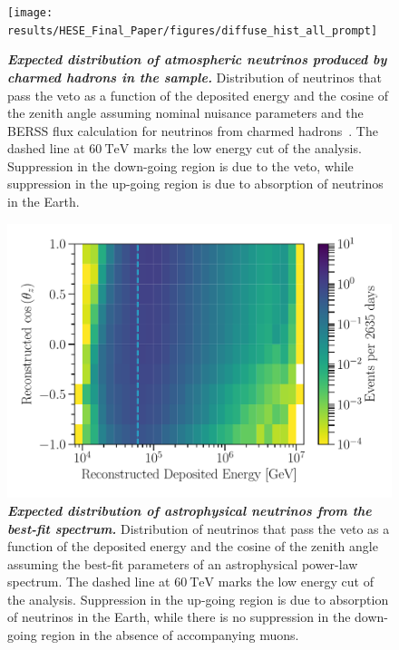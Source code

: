 \begin{figure}
	\centering
	\texttt{[image: results/HESE\_Final\_Paper/figures/diffuse\_hist\_all\_prompt]}
	\internallinenumbers
	\caption{\textbf{\textit{Expected distribution of atmospheric neutrinos produced by charmed hadrons in the sample.}} Distribution of neutrinos that pass the veto as a function of the deposited energy and the cosine of the zenith angle assuming nominal nuisance parameters and the BERSS flux calculation for neutrinos from  charmed hadrons~\cite{Bhattacharya:2015jpa}.
		The dashed line at $\SI{60}\TeV$ marks the low energy cut of the analysis.
		Suppression in the down-going region is due to the veto, while suppression in the up-going region is due to absorption of neutrinos in the Earth.}\label{fig:prompt_distribution}
\end{figure}

\begin{figure}
	\centering
	\includegraphics[width=0.8\linewidth]{figures/diffuse_hist_all_astro_fit}
	\internallinenumbers
	\caption{\textbf{\textit{Expected distribution of astrophysical neutrinos from the best-fit spectrum.}} Distribution of neutrinos that pass the veto as a function of the deposited energy and the cosine of the zenith angle assuming the best-fit parameters of an astrophysical power-law spectrum.
	The dashed line at $\SI{60}\TeV$ marks the low energy cut of the analysis.
	Suppression in the up-going region is due to absorption of neutrinos in the Earth, while there is no suppression in the down-going region in the absence of accompanying muons.}\label{fig:astro_distribution}
\end{figure}

